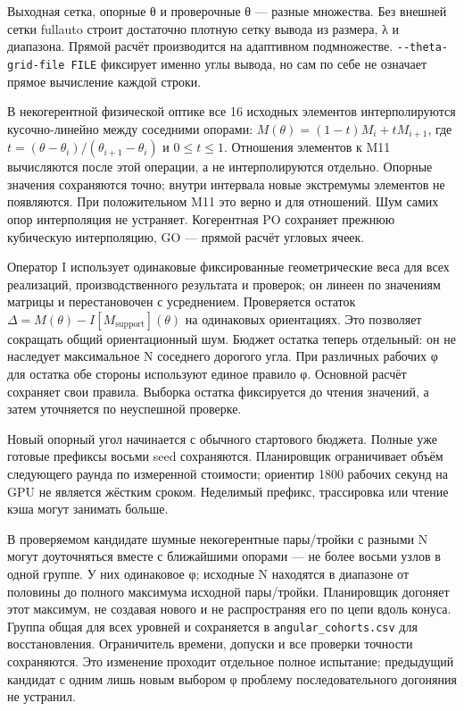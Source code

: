 Выходная сетка, опорные θ и проверочные θ --- разные множества. Без
внешней сетки fullauto строит достаточно плотную сетку вывода из
размера, λ и диапазона. Прямой расчёт производится на адаптивном
подмножестве. \texttt{-\/-theta-grid-file\ FILE} фиксирует именно углы
вывода, но сам по себе не означает прямое вычисление каждой строки.

В некогерентной физической оптике все 16 исходных элементов
интерполируются кусочно-линейно между соседними опорами:
\(M(\theta)=(1-t)M_i+tM_{i+1}\), где
\(t=(\theta-\theta_i)/(\theta_{i+1}-\theta_i)\) и \(0\leq t\leq1\).
Отношения элементов к M11 вычисляются после этой операции, а не
интерполируются отдельно. Опорные значения сохраняются точно; внутри
интервала новые экстремумы элементов не появляются. При положительном
M11 это верно и для отношений. Шум самих опор интерполяция не устраняет.
Когерентная PO сохраняет прежнюю кубическую интерполяцию, GO --- прямой
расчёт угловых ячеек.

Оператор I использует одинаковые фиксированные геометрические веса для
всех реализаций, производственного результата и проверок; он линеен по
значениям матрицы и перестановочен с усреднением. Проверяется остаток
\(\Delta=M(\theta)-I[M_{\mathrm{support}}](\theta)\) на одинаковых
ориентациях. Это позволяет сокращать общий ориентационный шум. Бюджет
остатка теперь отдельный: он не наследует максимальное N соседнего
дорогого угла. При различных рабочих φ для остатка обе стороны
используют единое правило φ. Основной расчёт сохраняет свои правила.
Выборка остатка фиксируется до чтения значений, а затем уточняется по
неуспешной проверке.

Новый опорный угол начинается с обычного стартового бюджета. Полные уже
готовые префиксы восьми seed сохраняются. Планировщик ограничивает объём
следующего раунда по измеренной стоимости; ориентир 1800 рабочих секунд
на GPU не является жёстким сроком. Неделимый префикс, трассировка или
чтение кэша могут занимать больше.

В проверяемом кандидате шумные некогерентные пары/тройки с разными N
могут доуточняться вместе с ближайшими опорами --- не более восьми узлов
в одной группе. У них одинаковое φ; исходные N находятся в диапазоне от
половины до полного максимума исходной пары/тройки. Планировщик догоняет
этот максимум, не создавая нового и не распространяя его по цепи вдоль
конуса. Группа общая для всех уровней и сохраняется в
\nolinkurl{angular_cohorts.csv} для восстановления. Ограничитель времени,
допуски и все проверки точности сохраняются. Это изменение проходит
отдельное полное испытание; предыдущий кандидат с одним лишь новым
выбором φ проблему последовательного догоняния не устранил.

